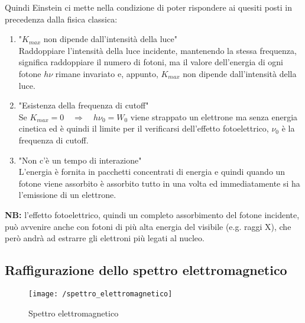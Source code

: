 Quindi Einstein ci mette nella condizione di poter rispondere ai quesiti posti in precedenza dalla fisica classica:
\begin{enumerate}[label=\Roman{*}]
\item "$K_{max}$ non dipende dall'intensità della luce" \\
Raddoppiare l'intensità della luce incidente, mantenendo la stessa frequenza, significa raddoppiare il numero di fotoni, ma il valore dell'energia di ogni fotone $h\nu$ rimane invariato e, appunto, $K_{max}$ non dipende dall'intensità della luce.

\item "Esistenza della frequenza di cutoff"\\
Se $K_{max} = 0 \quad \Rightarrow \quad h\nu_0 = W_0$ viene strappato un elettrone ma senza energia cinetica ed è quindi il limite per il verificarsi dell'effetto fotoelettrico, $\nu_0$ è la frequenza di cutoff.

\item "Non c'è un tempo di interazione"\\
L'energia è fornita in pacchetti concentrati di energia e quindi quando un fotone viene assorbito è assorbito tutto in una volta ed immediatamente si ha l'emissione di un elettrone.
\end{enumerate}

\textbf{NB:} l'effetto fotoelettrico, quindi un completo assorbimento del fotone incidente, può avvenire anche con fotoni di più alta energia del visibile (e.g. raggi X), che però andrà ad estrarre gli elettroni più legati al nucleo.

\subsection{Raffigurazione dello spettro elettromagnetico}
\begin{figure}[h]
\centering
\texttt{[image: /spettro\_elettromagnetico]}
\caption{Spettro elettromagnetico}
\end{figure}

